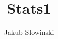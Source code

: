 \documentclass{article}
\title{Stats1}
\author{Jakub Slowinski}
\begin{document}
\begin{enumerate}
  
\end{enumerate}
\end{document}
